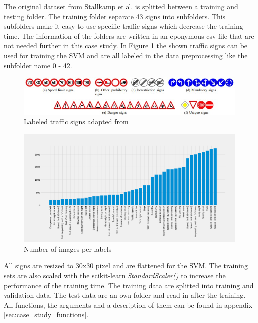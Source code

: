 The original dataset from Stallkamp et al. is splitted between a training and testing folder. The training folder separate 43 signs into subfolders. This subfolders make it easy to use specific traffic signs which decrease the training time. The information of the folders are written in an eponymous csv-file that are not needed further in this case study. In Figure \ref{fig:traffic_signs} the shown traffic signs can be used for training the SVM and are all labeled in the data preprocessing like the subfolder name 0 - 42.

\begin{figure}[h!]
  \centering
  \includegraphics[width=12cm]{pictures/traffic_signs.jpg}
  \caption{Labeled traffic signs adapted from \cite{DBLP:conf/ijcnn/StallkampSSI11}}
  \label{fig:traffic_signs}
\end{figure}

\begin{figure}[h!]
  \centering
  \includegraphics[width=14cm]{pictures/num_of_images.png}
  \caption{Number of images per labels}
  \label{fig:num_of_images}
\end{figure}

All signs are resized to 30x30 pixel and are flattened for the SVM. The training sets are also scaled with the scikit-learn \textit{StandardScaler()} to increase the performance of the training time. The training data are splitted into training and validation data. The test data are an own folder and read in after the training. All functions, the arguments and a description of them can be found in appendix \ref{sec:case_study_functions}.

